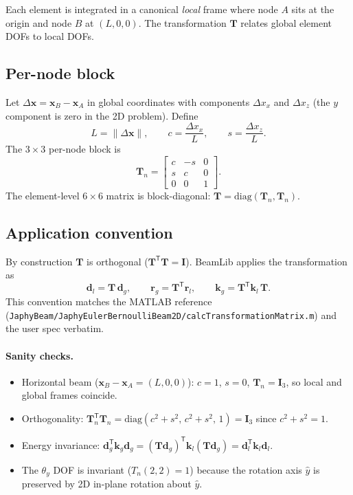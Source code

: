 \documentclass[11pt,a4paper]{article}
\newcommand{\bmath}[1]{\boldsymbol{#1}}
\begin{document}
Each element is integrated in a canonical \emph{local} frame where node $A$ sits at the origin and node $B$ at $(L, 0, 0)$. The transformation $\bmath{T}$ relates global element DOFs to local DOFs.

\subsection{Per-node block}

Let $\Delta\bmath{x} = \bmath{x}_B - \bmath{x}_A$ in global coordinates with components $\Delta x_x$ and $\Delta x_z$ (the $y$ component is zero in the 2D problem). Define
\[
L = \|\Delta\bmath{x}\|,\qquad c = \frac{\Delta x_x}{L},\qquad s = \frac{\Delta x_z}{L}.
\]
The $3\times 3$ per-node block is
\[
\bmath{T}_n =
\begin{bmatrix}
c & -s & 0 \\
s &  c & 0 \\
0 &  0 & 1
\end{bmatrix}.
\]
The element-level $6\times 6$ matrix is block-diagonal: $\bmath{T} = \mathrm{diag}(\bmath{T}_n, \bmath{T}_n)$.

\subsection{Application convention}

By construction $\bmath{T}$ is orthogonal ($\bmath{T}^\mathsf{T}\bmath{T} = \bmath{I}$). BeamLib applies the transformation as
\[
\bmath{d}_l = \bmath{T}\,\bmath{d}_g, \qquad
\bmath{r}_g = \bmath{T}^\mathsf{T}\bmath{r}_l, \qquad
\bmath{k}_g = \bmath{T}^\mathsf{T}\bmath{k}_l\,\bmath{T}.
\]
This convention matches the MATLAB reference (\texttt{JaphyBeam/JaphyEulerBernoulliBeam2D/calcTransformationMatrix.m}) and the user spec verbatim.

\paragraph{Sanity checks.}
\begin{itemize}
    \item Horizontal beam ($\bmath{x}_B - \bmath{x}_A = (L,0,0)$): $c=1$, $s=0$, $\bmath{T}_n = \bmath{I}_3$, so local and global frames coincide.
    \item Orthogonality: $\bmath{T}_n^\mathsf{T}\bmath{T}_n = \mathrm{diag}(c^2+s^2,\,c^2+s^2,\,1) = \bmath{I}_3$ since $c^2+s^2 = 1$.
    \item Energy invariance: $\bmath{d}_g^\mathsf{T}\bmath{k}_g\bmath{d}_g = (\bmath{T}\bmath{d}_g)^\mathsf{T}\bmath{k}_l(\bmath{T}\bmath{d}_g) = \bmath{d}_l^\mathsf{T}\bmath{k}_l\bmath{d}_l$.
    \item The $\theta_y$ DOF is invariant ($T_n(2,2) = 1$) because the rotation axis $\hat{y}$ is preserved by 2D in-plane rotation about $\hat{y}$.
\end{itemize}
\end{document}
